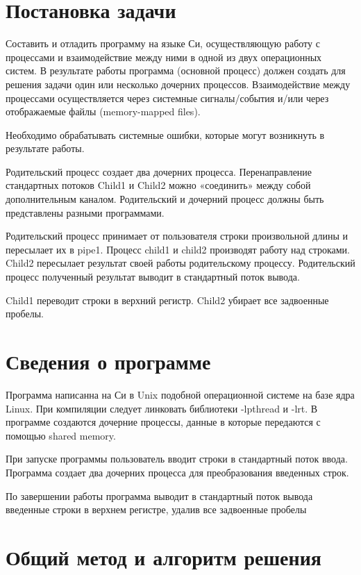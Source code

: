\documentclass[pdf, unicode, 12pt, a4paper,oneside,fleqn]{article}
\begin{document}
\pagebreak

\section{Постановка задачи}

Составить и отладить программу на языке Си, осуществляющую работу с процессами 
и взаимодействие между ними в одной из двух операционных систем. В результате работы 
программа (основной процесс) должен создать для решения задачи один или несколько 
дочерних процессов. Взаимодействие между процессами осуществляется через системные 
сигналы/события и/или через отображаемые файлы (memory-mapped files).

Необходимо обрабатывать системные ошибки, которые могут возникнуть в результате работы.

Родительский процесс создает два дочерних процесса. Перенаправление стандартных потоков
Child1 и Child2 можно «соединить» между собой
дополнительным каналом. Родительский и дочерний процесс должны быть представлены
разными программами.

Родительский процесс принимает от пользователя строки произвольной длины и пересылает их в
pipe1. Процесс child1 и child2 производят работу над строками. Child2 пересылает результат своей
работы родительскому процессу. Родительский процесс полученный результат выводит в
стандартный поток вывода.


Child1 переводит строки в верхний регистр. Child2 убирает все задвоенные пробелы.

\section{Сведения о программе}

Программа написанна на Си в Unix подобной операционной системе на базе ядра Linux.
При компиляции следует линковать библиотеки -lpthread и -lrt.
В программе создаются дочерние процессы, данные в которые передаются с помощью shared memory.

При запуске программы пользователь вводит строки в стандартный поток ввода. Программа создает два дочерних процесса для преобразования введенных строк.

По завершении работы программа выводит в стандартный поток вывода введенные строки в верхнем регистре, удалив все задвоенные пробелы


\section{Общий метод и алгоритм решения}
\end{document}
